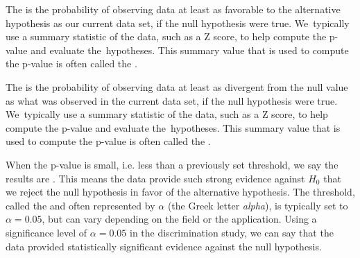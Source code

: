\begin{termBox}{
The  is the probability of observing data at least as favorable to the alternative hypothesis as our current data set, if the null hypothesis were true. We~typically use a summary statistic of the data, such as a Z score, to help compute the p-value and evaluate the~hypotheses. This summary value that is used to compute the p-value is often called the .}
\end{termBox}

\begin{termBox}{
The  is the probability of observing data at least as divergent from the null value as what was observed in the current data set, if the null hypothesis were true. We~typically use a summary statistic of the data, such as a Z score, to help compute the p-value and evaluate the~hypotheses. This summary value that is used to compute the p-value is often called the .}
\end{termBox}

When the p-value is small, i.e. less than a previously set threshold, we say the results are . This means the data provide such strong evidence against $H_0$ that we reject the null hypothesis in favor of the alternative hypothesis. The threshold, called the  and often represented by $\alpha$ (the Greek letter \emph{alpha}\label{alphadiscussion}), is typically set to $\alpha = 0.05$, but can vary depending on the field or the application. Using a  significance level of $\alpha = 0.05$ in the discrimination study, we can say that the data provided statistically significant evidence against the null hypothesis.

